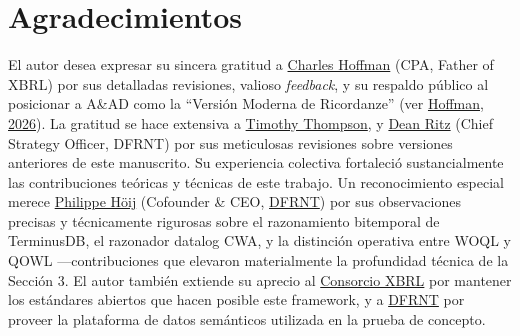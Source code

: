 \documentclass[12pt, a4paper]{article}
\begin{document}
\section*{Agradecimientos}

El autor desea expresar su sincera gratitud a \href{https://www.linkedin.com/in/charleshoffmancpa/}{Charles Hoffman} (CPA, Father of XBRL) por sus detalladas revisiones, valioso \textit{feedback}, y su respaldo público al posicionar a A\&AD como la ``Versión Moderna de Ricordanze'' (ver \href{https://digitalfinancialreporting.blogspot.com/2026/07/modern-version-of-ricordanze.html}{Hoffman, 2026}). La gratitud se hace extensiva a \href{https://www.linkedin.com/in/timathompson/}{Timothy Thompson}, y \href{https://www.linkedin.com/in/deanritz/}{Dean Ritz} (Chief Strategy Officer, DFRNT) por sus meticulosas revisiones sobre versiones anteriores de este manuscrito. Su experiencia colectiva fortaleció sustancialmente las contribuciones teóricas y técnicas de este trabajo. Un reconocimiento especial merece \href{https://www.linkedin.com/in/hoijnet/}{Philippe Höij} (Cofounder \& CEO, \href{https://dfrnt.com}{DFRNT}) por sus observaciones precisas y técnicamente rigurosas sobre el razonamiento bitemporal de TerminusDB, el razonador datalog CWA, y la distinción operativa entre WOQL y QOWL ---contribuciones que elevaron materialmente la profundidad técnica de la Sección 3. El autor también extiende su aprecio al \href{https://www.xbrl.org}{Consorcio XBRL} por mantener los estándares abiertos que hacen posible este framework, y a \href{https://dfrnt.com}{DFRNT} por proveer la plataforma de datos semánticos utilizada en la prueba de concepto.
\end{document}

